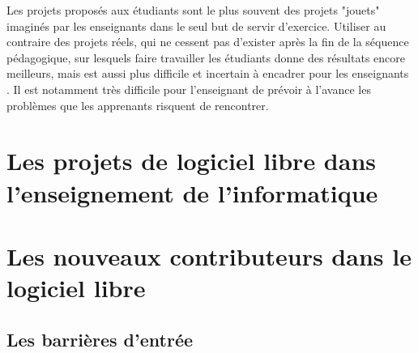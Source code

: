 Les projets proposés aux étudiants sont le plus souvent des projets "jouets" imaginés par les enseignants dans
le seul but de servir d'exercice. Utiliser au contraire des projets réels, qui ne cessent pas d'exister après
la fin de la séquence pédagogique, sur lesquels faire travailler les étudiants donne des résultats encore
meilleurs, mais est aussi plus difficile et incertain à encadrer pour les enseignants
. Il est notamment très difficile pour l'enseignant de prévoir à
l'avance les problèmes que les apprenants risquent de rencontrer.

\section{Les projets de logiciel libre dans l'enseignement de l'informatique}


\section{Les nouveaux contributeurs dans le logiciel libre}

\subsection{Les barrières d'entrée}

